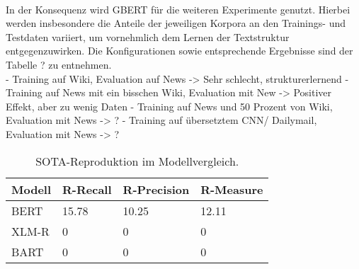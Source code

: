 \noindent{}\\


\noindent
In der Konsequenz wird \ac{GBERT} für die weiteren Experimente genutzt. Hierbei werden insbesondere die Anteile der jeweiligen Korpora an den Trainings- und Testdaten variiert, um vornehmlich dem Lernen der Textstruktur entgegenzuwirken. Die Konfigurationen sowie entsprechende Ergebnisse sind der Tabelle ? zu entnehmen.\\


\noindent
- Training auf Wiki, Evaluation auf News
  -> Sehr schlecht, strukturerlernend
- Training auf News mit ein bisschen Wiki, Evaluation mit New
   -> Positiver Effekt, aber zu wenig Daten
- Training auf News und 50 Prozent von Wiki, Evaluation mit News
  -> ?
- Training auf übersetztem CNN/ Dailymail, Evaluation mit News
  -> ?
  
\begin{table}[htb]
\centering
\begin{tabular}{ | p{2.5cm} | p{2.5cm} | p{2.5cm} | p{2.5cm} | }
\hline
\textbf{Modell} & \textbf{R-Recall} & \textbf{R-Precision} & \textbf{R-Measure} \\
\hline
BERT & 15.78 & 10.25 & 12.11 \\
\hline
XLM-R & 0 & 0 & 0 \\
\hline
BART & 0 & 0 & 0 \\
\hline
\end{tabular}
\caption{SOTA-Reproduktion im Modellvergleich.}
\label{table:SotaRougeScores}
\end{table}


